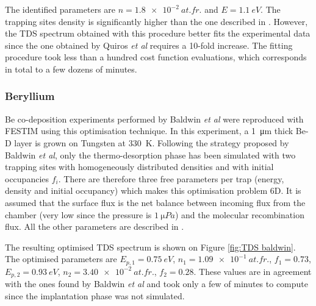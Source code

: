 The identified parameters are $n = \SI{1.8e-2}{at.fr.}$ and $E =\SI{1.1}{eV}$.
The trapping sites density is significantly higher than the one described in \cite{quiros_blister_2017}.
However, the TDS spectrum obtained with this procedure better fits the experimental data since the one obtained by Quiros \textit{et al} requires a 10-fold increase.
The fitting procedure took less than a hundred cost function evaluations, which corresponds in total to a few dozens of minutes.

\subsubsection{Beryllium}
Be co-deposition experiments performed by Baldwin \textit{et al}  were reproduced with FESTIM using this optimisation technique.
In this experiment, a \SI{1}{\micro m} thick Be-D layer is grown on Tungsten at \SI{330}{K}. 
Following the strategy proposed by Baldwin \textit{et al}, only the thermo-desorption phase has been simulated with two trapping sites with homogeneously distributed densities and with initial occupancies $f_i$.
There are therefore three free parameters per trap (energy, density and initial occupancy) which makes this optimisation problem 6D.
It is assumed that the surface flux is the net balance between incoming flux from the chamber (very low since the pressure is $\SI{1}{\micro Pa}$) and the molecular recombination flux.
All the other parameters are described in \cite{baldwin_experimental_2014}.

The resulting optimised TDS spectrum is shown on Figure \ref{fig:TDS baldwin}.
The optimised parameters are $E_{p, 1} = \SI{0.75}{eV}$, $n_1 = \SI{1.09e-1}{at.fr.}$, $f_1=0.73$, $E_{p, 2} = \SI{0.93}{eV}$, \newline ${n_2 = \SI{3.40e-2}{at.fr.}}$, $f_2=0.28$.
These values are in agreement with the ones found by Baldwin \textit{et al} \cite{baldwin_experimental_2014} and took only a few of minutes to compute since the implantation phase was not simulated.

